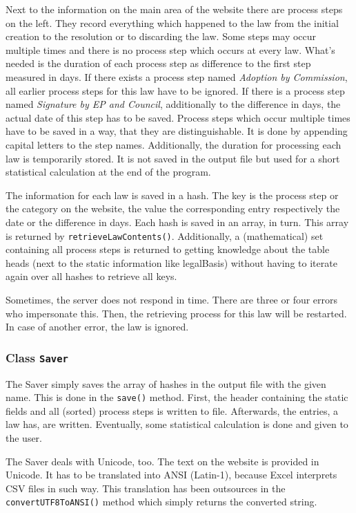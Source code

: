 \documentclass{scrartcl}
\begin{document}
Next to the information on the main area of the website there are process steps on the left. They record everything which happened to the law from the initial creation to the resolution or to discarding the law. Some steps may occur multiple times and there is no process step which occurs at every law. What's needed is the duration of each process step as difference to the first step measured in days. If there exists a process step named \textit{Adoption by Commission}, all earlier process steps for this law have to be ignored. If there is a process step named \textit{Signature by EP and Council}, additionally to the difference in days, the actual date of this step has to be saved. Process steps which occur multiple times have to be saved in a way, that they are distinguishable. It is done by appending capital letters to the step names. Additionally, the duration for processing each law is temporarily stored. It is not saved in the output file but used for a short statistical calculation at the end of the program.

The information for each law is saved in a hash. The key is the process step or the category on the website, the value the corresponding entry respectively the date or the difference in days. Each hash is saved in an array, in turn. This array is returned by \texttt{retrieveLawContents()}. Additionally, a (mathematical) set containing all process steps is returned to getting knowledge about the table heads (next to the static information like legalBasis) without having to iterate again over all hashes to retrieve all keys.

Sometimes, the server does not respond in time. There are three or four errors who impersonate this. Then, the retrieving process for this law will be restarted. In case of another error, the law is ignored.



\subsubsection{Class \texttt{Saver}}
The Saver simply saves the array of hashes in the output file with the given name. This is done in the \texttt{save()} method. First, the header containing the static fields and all (sorted) process steps is written to file. Afterwards, the entries, a law has, are written. Eventually, some statistical calculation is done and given to the user.

The Saver deals with Unicode, too. The text on the website is provided in Unicode. It has to be translated into ANSI (Latin-1), because Excel interprets CSV files in such way. This translation has been outsources in the \texttt{convertUTF8ToANSI()} method which simply returns the converted string.
\end{document}
